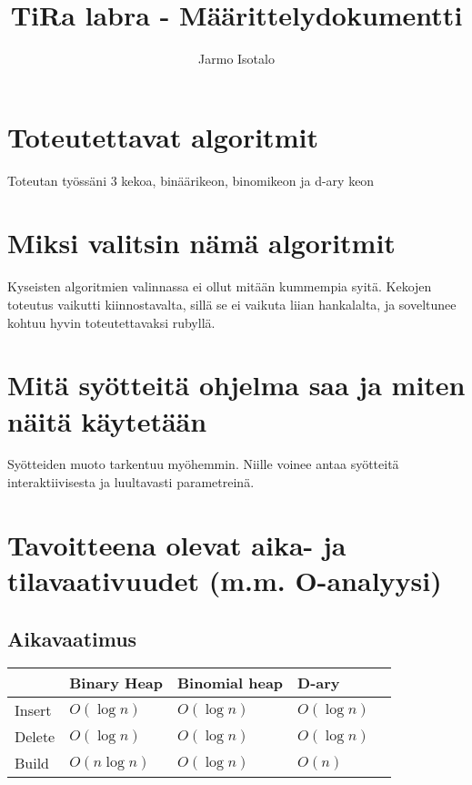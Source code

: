 \documentclass[a4paper,12pt]{article}
\begin{document}
\title{TiRa labra - Määrittelydokumentti} 
\author{Jarmo Isotalo}
\maketitle

\section{Toteutettavat algoritmit}

Toteutan työssäni 3 kekoa, binäärikeon, binomikeon ja d-ary keon

\section{Miksi valitsin nämä algoritmit}

Kyseisten algoritmien valinnassa ei ollut mitään kummempia syitä. Kekojen toteutus vaikutti
kiinnostavalta, sillä se ei vaikuta liian hankalalta, ja soveltunee kohtuu hyvin toteutettavaksi rubyllä.

\section{Mitä syötteitä ohjelma saa ja miten näitä käytetään}
Syötteiden muoto tarkentuu myöhemmin. 
Niille voinee antaa syötteitä interaktiivisesta ja luultavasti parametreinä.

\section{Tavoitteena olevat aika- ja tilavaativuudet (m.m. O-analyysi)}

\subsection{Aikavaatimus}
\begin{tabular}{|l|l|l|l|l|}
\hline
&Binary Heap & Binomial heap & D-ary \\\hline
Insert & $O (\log n)$ & $O (\log n)$ & $O (\log n)$\\\hline
Delete  & $O (\log n)$ & $O (\log n)$ & $O (\log n)$\\\hline
Build & $O (n \log n)$ & $O (\log n)$ & $O (n)$\\\hline
\end{tabular}
\end{document}
